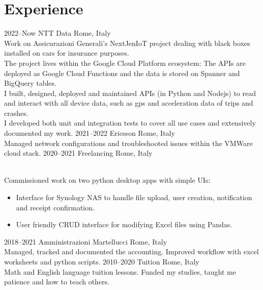 \documentclass[]{cv-style}          %
\begin{document}
\section{Experience}

\begin{entrylist}
\entry
{2022--Now}
{NTT Data}
{Rome, Italy}
{\\
Work on Assicurazioni Generali's NextJenIoT project dealing with black boxes installed on cars for insurance purposes.\\
The project lives within the Google Cloud Platform ecosystem: The APIs are deployed as Google Cloud Functions and the data is stored on Spanner and BigQuery tables.\\
I built, designed, deployed and maintained APIs (in Python and Nodejs) to read and interact with all device data, such as gps and acceleration data of trips and crashes.\\
I developed both unit and integration tests to cover all use cases and extensively documented my work.}
\entry
{2021--2022}
{Ericsson}
{Rome, Italy}
{\\
Managed network configurations and troubleshooted issues within the VMWare cloud stack.}
\entry 
  {2020--2021}
  {Freelancing}
  {Rome, Italy}
  {\\
  Commissioned work on two python desktop apps with simple UIs:
  \begin{itemize}
      \item Interface for Synology NAS to handle file upload, user creation, notification and receipt confirmation.
      \item User friendly CRUD interface for modifying Excel files using Pandas.
  \end{itemize}
}
\entry
  {2018--2021}
  {Amministrazioni Martellucci}
  {Rome, Italy}
  {\\
  Managed, tracked and documented the accounting. Improved workflow with excel worksheets and python scripts.
  }
\entry
  {2010--2020}
  {Tuition}
  {Rome, Italy}
  {\\
    Math and English language tuition lessons. Funded my studies, taught me patience and how to teach others.
  }
\end{entrylist}
\end{document}
